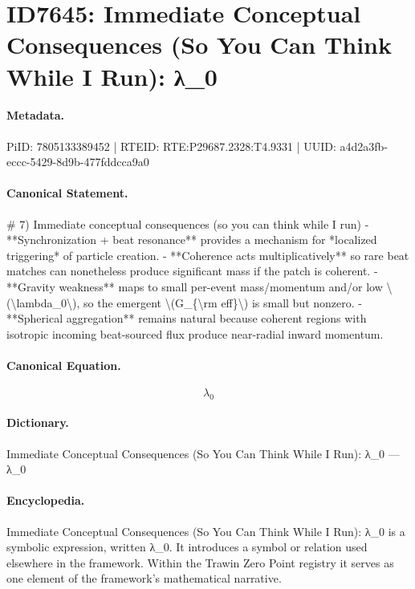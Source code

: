 \section*{ID7645: Immediate Conceptual Consequences (So You Can Think While I Run): λ\_0}
\paragraph{Metadata.}
PiID: 7805133389452 | RTEID: RTE:P29687.2328:T4.9331 | UUID: a4d2a3fb-eccc-5429-8d9b-477fddcca9a0

\paragraph{Canonical Statement.}
\# 7) Immediate conceptual consequences (so you can think while I run) - **Synchronization + beat resonance** provides a mechanism for *localized triggering* of particle creation. - **Coherence acts multiplicatively** so rare beat matches can nonetheless produce significant mass if the patch is coherent. - **Gravity weakness** maps to small per-event mass/momentum and/or low \textbackslash{}(\textbackslash{}lambda\_0\textbackslash{}), so the emergent \textbackslash{}(G\_\{\textbackslash{}rm eff\}\textbackslash{}) is small but nonzero. - **Spherical aggregation** remains natural because coherent regions with isotropic incoming beat-sourced flux produce near-radial inward momentum.

\paragraph{Canonical Equation.}
\[
\lambda_0
\]

\paragraph{Dictionary.}
Immediate Conceptual Consequences (So You Can Think While I Run): λ\_0 — λ\_0

\paragraph{Encyclopedia.}
Immediate Conceptual Consequences (So You Can Think While I Run): λ\_0 is a symbolic expression, written λ\_0. It introduces a symbol or relation used elsewhere in the framework. Within the Trawin Zero Point registry it serves as one element of the framework's mathematical narrative.

